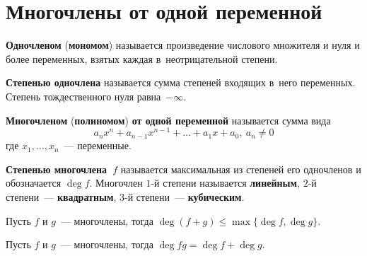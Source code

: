 \section{Многочлены от одной переменной}
  \textbf{Одночленом} (\textbf{мономом}) называется произведение числового множителя и нуля и более переменных, взятых каждая в~неотрицательной степени.

\textbf{Степенью одночлена} называется сумма степеней входящих в~него переменных.
Степень тождественного нуля равна~$-\infty$.

  \textbf{Многочленом} (\textbf{полиномом}) \textbf{от одной переменной} называется сумма вида
\begin{equation*}
a_n x^n + a_{n-1} x^{n-1} + \ldots + a_1 x + a_0, \ a_n \neq 0
\end{equation*}
где $x_1, \ldots, x_n$~--- переменные.

 \textbf{Степенью многочлена~$f$} называется максимальная из степеней его одночленов и обозначается $\deg f$.
Многочлен $1$-й степени называется \textbf{линейным}, $2$-й степени~--- \textbf{квадратным}, $3$-й степени~--- \textbf{кубическим}.

\begin{statement}
Пусть $f$ и $g$~--- многочлены, тогда $\deg (f + g) \leqslant \max \{ \deg f, \deg g \}$.
\end{statement}
\begin{statement}
Пусть $f$ и $g$~--- многочлены, тогда $\deg fg = \deg f + \deg g$.
\end{statement}

